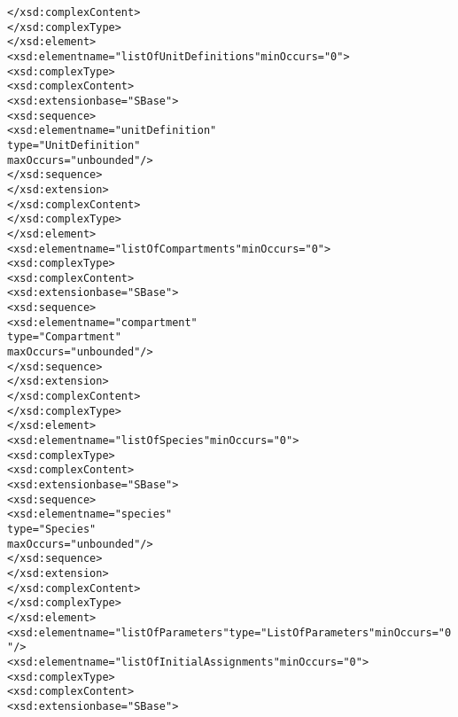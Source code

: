 \begin{alltt}
                            </xsd:complexContent>
                        </xsd:complexType>
                    </xsd:element>
                    <xsd:element name="listOfUnitDefinitions" minOccurs="0">
                        <xsd:complexType>
                            <xsd:complexContent>
                                <xsd:extension base="SBase">
                                    <xsd:sequence>
                                        <xsd:element name="unitDefinition" 
                                                     type="UnitDefinition" 
                                                     maxOccurs="unbounded"/>
                                    </xsd:sequence>
                                </xsd:extension>
                            </xsd:complexContent>
                        </xsd:complexType>
                    </xsd:element>
                    <xsd:element name="listOfCompartments" minOccurs="0">
                        <xsd:complexType>
                            <xsd:complexContent>
                                <xsd:extension base="SBase">
                                    <xsd:sequence>
                                        <xsd:element name="compartment" 
                                                     type="Compartment" 
                                                     maxOccurs="unbounded"/>
                                    </xsd:sequence>
                                </xsd:extension>
                            </xsd:complexContent>
                        </xsd:complexType>
                    </xsd:element>
                    <xsd:element name="listOfSpecies" minOccurs="0">
                        <xsd:complexType>
                            <xsd:complexContent>
                                <xsd:extension base="SBase">
                                    <xsd:sequence>
                                        <xsd:element name="species" 
                                                     type="Species" 
                                                     maxOccurs="unbounded"/>
                                    </xsd:sequence>
                                </xsd:extension>
                            </xsd:complexContent>
                        </xsd:complexType>
                    </xsd:element>
                    <xsd:element name="listOfParameters" type="ListOfParameters" minOccurs="0"/>
                    <xsd:element name="listOfInitialAssignments" minOccurs="0">
                        <xsd:complexType>
                            <xsd:complexContent>
                                <xsd:extension base="SBase">

\end{alltt}
